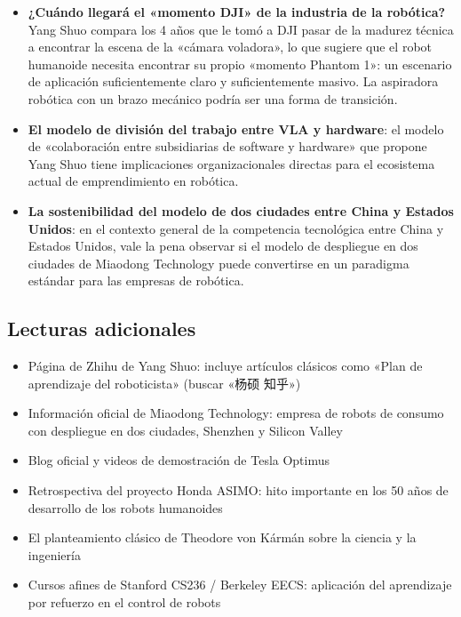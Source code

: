 \documentclass[a4paper]{article}
\begin{document}
\begin{itemize}
    \item \textbf{¿Cuándo llegará el «momento DJI» de la industria de la robótica?} Yang Shuo compara los 4 años que le tomó a DJI pasar de la madurez técnica a encontrar la escena de la «cámara voladora», lo que sugiere que el robot humanoide necesita encontrar su propio «momento Phantom 1»: un escenario de aplicación suficientemente claro y suficientemente masivo. La aspiradora robótica con un brazo mecánico podría ser una forma de transición.
    \item \textbf{El modelo de división del trabajo entre VLA y hardware}: el modelo de «colaboración entre subsidiarias de software y hardware» que propone Yang Shuo tiene implicaciones organizacionales directas para el ecosistema actual de emprendimiento en robótica.
    \item \textbf{La sostenibilidad del modelo de dos ciudades entre China y Estados Unidos}: en el contexto general de la competencia tecnológica entre China y Estados Unidos, vale la pena observar si el modelo de despliegue en dos ciudades de Miaodong Technology puede convertirse en un paradigma estándar para las empresas de robótica.
\end{itemize}

\subsection{Lecturas adicionales}

\begin{itemize}
    \item Página de Zhihu de Yang Shuo: incluye artículos clásicos como «Plan de aprendizaje del roboticista» (buscar «杨硕 知乎»)
    \item Información oficial de Miaodong Technology: empresa de robots de consumo con despliegue en dos ciudades, Shenzhen y Silicon Valley
    \item Blog oficial y videos de demostración de Tesla Optimus
    \item Retrospectiva del proyecto Honda ASIMO: hito importante en los 50 años de desarrollo de los robots humanoides
    \item El planteamiento clásico de Theodore von K\'arm\'an sobre la ciencia y la ingeniería
    \item Cursos afines de Stanford CS236 / Berkeley EECS: aplicación del aprendizaje por refuerzo en el control de robots
\end{itemize}

\end{document}
